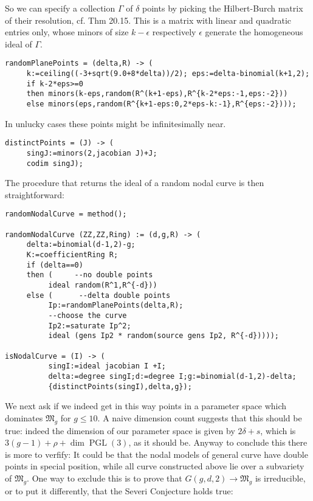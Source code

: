 \documentclass[12pt,leqno]{amsart}
\newlength{\ho}
\DeclareMathOperator{\PGL}{PGL}
\newcommand{\gM}{\mathfrak M}
\begin{document}
\noindent
So we can specify a collection $\Gamma$ of $\delta$ points by picking 
the Hilbert-Burch matrix of their resolution, cf. \cite{Ei}{Thm 20.15}. 
This is a matrix with linear and quadratic entries only, 
whose minors of size $k-\epsilon$ respectively $\epsilon$ 
generate the homogeneous ideal of $\Gamma$.


{\scriptsize\begin{verbatim}
randomPlanePoints = (delta,R) -> (
     k:=ceiling((-3+sqrt(9.0+8*delta))/2); eps:=delta-binomial(k+1,2);
     if k-2*eps>=0 
     then minors(k-eps,random(R^(k+1-eps),R^{k-2*eps:-1,eps:-2}))
     else minors(eps,random(R^{k+1-eps:0,2*eps-k:-1},R^{eps:-2})));
\end{verbatim}}

\noindent
In unlucky cases these points might be infinitesimally near.

{\scriptsize\begin{verbatim}
distinctPoints = (J) -> (
     singJ:=minors(2,jacobian J)+J;
     codim singJ);
\end{verbatim}}


\medskip \noindent
The procedure that returns the ideal of a random nodal curve is then straightforward: 

{\scriptsize\begin{verbatim}
randomNodalCurve = method();

randomNodalCurve (ZZ,ZZ,Ring) := (d,g,R) -> (
     delta:=binomial(d-1,2)-g;
     K:=coefficientRing R;
     if (delta==0) 
     then (     --no double points
          ideal random(R^1,R^{-d}))
     else (      --delta double points            
          Ip:=randomPlanePoints(delta,R);
          --choose the curve
          Ip2:=saturate Ip^2;
          ideal (gens Ip2 * random(source gens Ip2, R^{-d}))));

isNodalCurve = (I) -> (
          singI:=ideal jacobian I +I;
          delta:=degree singI;d:=degree I;g:=binomial(d-1,2)-delta;
          {distinctPoints(singI),delta,g});
\end{verbatim}}


We next ask if we indeed get in this way points in a parameter space 
which dominates $\gM_g$ for $g \le 10$.
A naive dimension count suggests that this should be true:
indeed the dimension of our parameter space is given by $2\delta +s$, 
which is $3(g-1)+\rho+\dim\PGL(3)$, as it should be.
Anyway to conclude this there is more to verfify: 
It could be that the nodal models of general curve have double points 
in special position, 
while all curve constructed above lie over a subvariety of $\gM_g$. 
One way to exclude this is to prove that $G(g,d,2) \to \gM_g$ is irreducible, 
or to put it differently, that the Severi Conjecture holds true:
\end{document}
